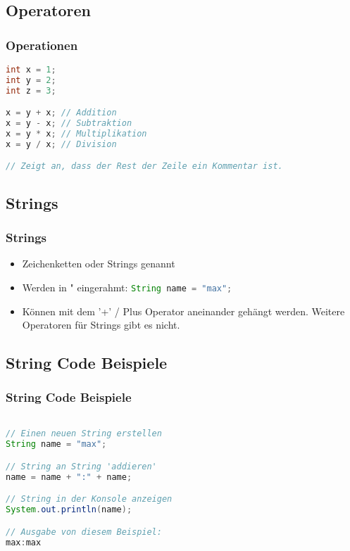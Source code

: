 \documentclass{beamer}
\begin{document}
\subsection{Operatoren}

\begin{frame}[fragile]
	\frametitle{Operationen}
	\begin{lstlisting}[language=java]
int x = 1;
int y = 2;
int z = 3;

x = y + x; // Addition
x = y - x; // Subtraktion
x = y * x; // Multiplikation
x = y / x; // Division

// Zeigt an, dass der Rest der Zeile ein Kommentar ist.
	\end{lstlisting}
\end{frame}


\subsection{Strings} 

\begin{frame}
	\frametitle{Strings}
	\begin{itemize}
		\item Zeichenketten oder Strings genannt
		\item Werden in " eingerahmt: \lstinline[language=java]{String name = "max";}
		\item Können mit dem '+' / Plus Operator aneinander gehängt werden. Weitere Operatoren für Strings gibt es nicht.
	\end{itemize}
\end{frame}

\subsection{String Code Beispiele}

\begin{frame}[fragile]
\frametitle{String Code Beispiele}
\begin{lstlisting}[language=java]

// Einen neuen String erstellen
String name = "max"; 

// String an String 'addieren'
name = name + ":" + name; 

// String in der Konsole anzeigen
System.out.println(name);

// Ausgabe von diesem Beispiel:
max:max

\end{lstlisting}
\end{frame}
\end{document}
